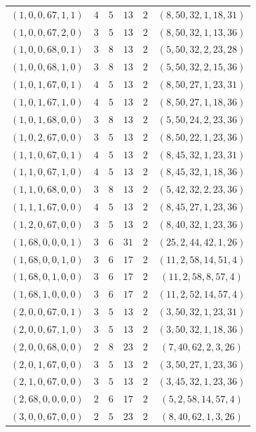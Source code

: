 \documentclass[11pt]{article}
\begin{document}
\begin{longtable}{crrrrc}
$(1,0,0,67,1,1)$ & $4$ & $5$ & $13$ & $2$ & $(8,50,32,1,18,31)$\\
$(1,0,0,67,2,0)$ & $3$ & $5$ & $13$ & $2$ & $(8,50,32,1,13,36)$\\
$(1,0,0,68,0,1)$ & $3$ & $8$ & $13$ & $2$ & $(5,50,32,2,23,28)$\\
$(1,0,0,68,1,0)$ & $3$ & $8$ & $13$ & $2$ & $(5,50,32,2,15,36)$\\
$(1,0,1,67,0,1)$ & $4$ & $5$ & $13$ & $2$ & $(8,50,27,1,23,31)$\\
$(1,0,1,67,1,0)$ & $4$ & $5$ & $13$ & $2$ & $(8,50,27,1,18,36)$\\
$(1,0,1,68,0,0)$ & $3$ & $8$ & $13$ & $2$ & $(5,50,24,2,23,36)$\\
$(1,0,2,67,0,0)$ & $3$ & $5$ & $13$ & $2$ & $(8,50,22,1,23,36)$\\
$(1,1,0,67,0,1)$ & $4$ & $5$ & $13$ & $2$ & $(8,45,32,1,23,31)$\\
$(1,1,0,67,1,0)$ & $4$ & $5$ & $13$ & $2$ & $(8,45,32,1,18,36)$\\
$(1,1,0,68,0,0)$ & $3$ & $8$ & $13$ & $2$ & $(5,42,32,2,23,36)$\\
$(1,1,1,67,0,0)$ & $4$ & $5$ & $13$ & $2$ & $(8,45,27,1,23,36)$\\
$(1,2,0,67,0,0)$ & $3$ & $5$ & $13$ & $2$ & $(8,40,32,1,23,36)$\\
$(1,68,0,0,0,1)$ & $3$ & $6$ & $31$ & $2$ & $(25,2,44,42,1,26)$\\
$(1,68,0,0,1,0)$ & $3$ & $6$ & $17$ & $2$ & $(11,2,58,14,51,4)$\\
$(1,68,0,1,0,0)$ & $3$ & $6$ & $17$ & $2$ & $(11,2,58,8,57,4)$\\
$(1,68,1,0,0,0)$ & $3$ & $6$ & $17$ & $2$ & $(11,2,52,14,57,4)$\\
$(2,0,0,67,0,1)$ & $3$ & $5$ & $13$ & $2$ & $(3,50,32,1,23,31)$\\
$(2,0,0,67,1,0)$ & $3$ & $5$ & $13$ & $2$ & $(3,50,32,1,18,36)$\\
$(2,0,0,68,0,0)$ & $2$ & $8$ & $23$ & $2$ & $(7,40,62,2,3,26)$\\
$(2,0,1,67,0,0)$ & $3$ & $5$ & $13$ & $2$ & $(3,50,27,1,23,36)$\\
$(2,1,0,67,0,0)$ & $3$ & $5$ & $13$ & $2$ & $(3,45,32,1,23,36)$\\
$(2,68,0,0,0,0)$ & $2$ & $6$ & $17$ & $2$ & $(5,2,58,14,57,4)$\\
$(3,0,0,67,0,0)$ & $2$ & $5$ & $23$ & $2$ & $(8,40,62,1,3,26)$\\
\bottomrule
\end{longtable}
\end{document}
